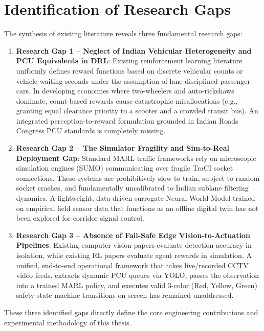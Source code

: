 \section{Identification of Research Gaps}
\label{sec:research_gaps}
The synthesis of existing literature reveals three fundamental research gaps:
\begin{enumerate}
    \item \textbf{Research Gap 1 -- Neglect of Indian Vehicular Heterogeneity and PCU Equivalents in DRL}: Existing reinforcement learning literature uniformly defines reward functions based on discrete vehicular counts or vehicle waiting seconds under the assumption of lane-disciplined passenger cars. In developing economies where two-wheelers and auto-rickshaws dominate, count-based rewards cause catastrophic misallocations (e.g., granting equal clearance priority to a scooter and a crowded transit bus). An integrated perception-to-reward formulation grounded in Indian Roads Congress PCU standards is completely missing.
    \item \textbf{Research Gap 2 -- The Simulator Fragility and Sim-to-Real Deployment Gap}: Standard MARL traffic frameworks rely on microscopic simulation engines (SUMO) communicating over fragile TraCI socket connections. These systems are prohibitively slow to train, subject to random socket crashes, and fundamentally uncalibrated to Indian sublane filtering dynamics. A lightweight, data-driven surrogate Neural World Model trained on empirical field sensor data that functions as an offline digital twin has not been explored for corridor signal control.
    \item \textbf{Research Gap 3 -- Absence of Fail-Safe Edge Vision-to-Actuation Pipelines}: Existing computer vision papers evaluate detection accuracy in isolation, while existing RL papers evaluate agent rewards in simulation. A unified, end-to-end operational framework that takes live/recorded CCTV video feeds, extracts dynamic PCU queues via YOLO, passes the observation into a trained MARL policy, and executes valid 3-color (Red, Yellow, Green) safety state machine transitions on screen has remained unaddressed.
\end{enumerate}

These three identified gaps directly define the core engineering contributions and experimental methodology of this thesis.
